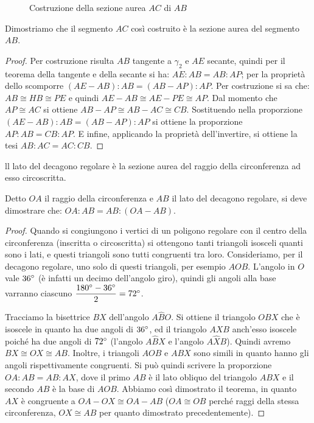 \begin{figure}[!htb]
	\centering
	\caption{Costruzione della sezione aurea $AC$ di $AB$}\label{fig:sez_aurea2}
\end{figure}

Dimostriamo che il segmento $AC$ così costruito è la sezione aurea del segmento $AB$.
\begin{proof}
Per costruzione risulta $AB$ tangente a $\gamma_2$ e $AE$ secante, quindi per il teorema della tangente e della secante si ha: $AE : AB = AB : AP$; per la proprietà dello scomporre $(AE-AB):AB=(AB-AP):AP$.
Per costruzione si sa che: $AB\cong HB\cong PE$ e quindi $AE - AB \cong AE - PE\cong AP$.
Dal momento che $AP\cong AC$ si ottiene $AB - AP \cong AB - AC \cong CB$.
Sostituendo nella proporzione $(AE-AB):AB=(AB-AP):AP$ si ottiene la proporzione $AP : AB = CB : AP$.
E infine, applicando la proprietà dell'invertire, si ottiene la tesi $AB : AC = AC : CB$.
\end{proof}

\begin{teorema}
ll lato del decagono regolare è la sezione aurea del raggio della circonferenza ad esso circoscritta.
\end{teorema}

Detto $OA$ il raggio della circonferenza e $AB$ il lato del decagono regolare, si deve dimostrare che: $OA:AB=AB:(OA-AB)$.

\begin{figure*}[!htb]
	\noindent\centering\hspace{2cm}
\end{figure*}

\begin{proof}
Quando si congiungono i vertici di un poligono regolare con il centro della circonferenza (inscritta o circoscritta) si ottengono tanti triangoli isosceli quanti sono i lati, e questi triangoli sono tutti congruenti tra loro.
Consideriamo, per il decagono regolare, uno solo di questi triangoli, per esempio $AOB$. L'angolo in $O$ vale $36{}^{\circ}$ (è infatti un decimo dell'angolo giro), quindi gli angoli alla base varranno ciascuno $\dfrac{180{}^{\circ}-36{}^{\circ}}{2} = 72{}^{\circ}$.

Tracciamo la bisettrice $BX$ dell'angolo $A\widehat{B}O$. Si ottiene il triangolo $OBX$ che è isoscele in quanto ha due angoli di $36{}^{\circ}$, ed il triangolo $AXB$ anch'esso isoscele poiché ha due angoli di $72{}^{\circ}$ (l'angolo $A\widehat{B}X$ e l'angolo $A\widehat{X}B$).  
Quindi avremo $BX\cong OX\cong AB$.
Inoltre, i triangoli $AOB$ e $ABX$ sono simili in quanto hanno gli angoli rispettivamente congruenti.
Si può quindi scrivere la proporzione $OA:AB=AB:AX$, dove il primo $AB$ è il lato obliquo del triangolo $ABX$ e il secondo $AB$ è la base di $AOB$.
Abbiamo così dimostrato il teorema, in quanto $AX$ è congruente a $OA-OX \cong OA-AB$ ($OA\cong OB$ perché raggi della stessa circonferenza, $OX\cong AB$ per quanto dimostrato precedentemente).
\end{proof}

